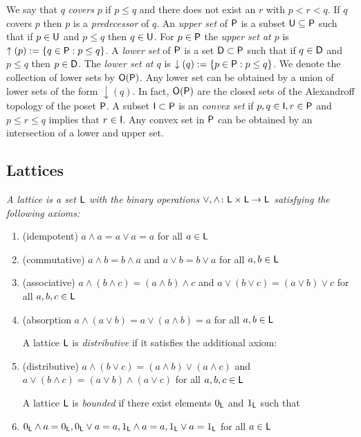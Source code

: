 We say that $q$ {\em covers} $p$ if $p\leq q$ and there does not exist an $r$ with $p< r < q$.  
If $q$ covers $p$ then $p$ is a {\em predecessor} of $q$.   An {\em upper set} of ${\mathsf P}$ is a subset ${\mathsf U}\subseteq {\mathsf P}$ such that if $p\in {\mathsf U}$ and $p\leq q$ then $q\in {\mathsf U}$.  For $p\in {\mathsf P}$ the {\em upper set at $p$} is $\uparrow(p):=\{q\in {\mathsf P}:p \leq q\}$.  
A {\em lower set} of ${\mathsf P}$ is a set ${\mathsf D}\subset {\mathsf P}$ such that if $q\in {\mathsf D}$ and $p\leq q$ then $p\in {\mathsf D}$.  The {\em lower set at $q$} is $\downarrow(q):=\{p\in {\mathsf P}: p \leq q\}$.  We denote the collection of lower sets by ${\mathsf O}({\mathsf P})$.  Any lower set can be obtained by a union of lower sets of the form $\downarrow(q)$.  In fact, ${\mathsf O}({\mathsf P})$ are the closed sets of the Alexandroff topology of the poset ${\mathsf P}$.  A subset ${\mathsf I}\subset {\mathsf P}$ is an {\em convex set} if $p,q\in {\mathsf I}, r\in {\mathsf P}$ and $ p \leq r \leq q$ implies that $r\in {\mathsf I}$.  Any convex set in ${\mathsf P}$ can be obtained by an intersection of a lower and upper set.  
 


\subsection{Lattices}

\begin{defn}
{\em
A {\em lattice} is a set ${\mathsf L}$ with the binary operations $\vee,\wedge \colon {\mathsf L}\times {\mathsf L}\to {\mathsf L}$ satisfying the following axioms:

\begin{enumerate}
\item (idempotent) $a\wedge a = a \vee a = a$ for all $a\in {\mathsf L}$
\item (commutative) $a\wedge b = b\wedge a$ and $a\vee b = b \vee a$ for all $a,b\in {\mathsf L}$
\item (associative) $a\wedge (b\wedge c) = (a\wedge b)\wedge c$ and $a\vee(b\vee c) = (a\vee b)\vee c$ for all $a,b,c\in {\mathsf L}$
\item (absorption $a\wedge (a\vee b) = a\vee (a\wedge b)=a$ for all $a,b\in {\mathsf L}$

A lattice ${\mathsf L}$ is {\em distributive} if it satisfies the additional axiom:

\item (distributive) $a\wedge (b\vee c) = (a\wedge b)\vee (a\wedge c)$ and $a\vee (b\wedge c) = (a\vee b) \wedge (a\vee c)$ for all $a,b,c\in {\mathsf L}$

A lattice ${\mathsf L}$ is {\em bounded} if there exist elements $0_{\mathsf L}$ and $1_{\mathsf L}$ such that

\item $0_{\mathsf L}\wedge a = 0_{\mathsf L}, 0_{\mathsf L}\vee a = a, 1_{\mathsf L}\wedge a = a, 1_{\mathsf L}\vee a = 1_{\mathsf L}$ for all $a\in {\mathsf L}$
\end{enumerate}
}
\end{defn}

